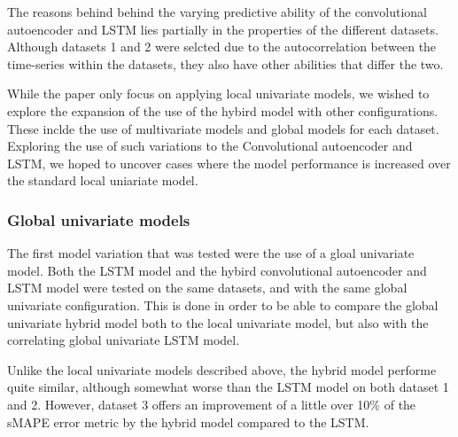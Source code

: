 The reasons behind behind the varying predictive ability of the convolutional autoencoder and LSTM lies partially
in the properties of the different datasets.
Although datasets 1 and 2 were selcted due to the autocorrelation between the time-series within the datasets,
they also have other abilities that differ the two.

  



While the paper \cite{Zhao2019} only focus on applying local univariate models,
we wished to explore the expansion of the use of the hybird model with other configurations.
These inclde the use of multivariate models and global models for each dataset.
Exploring the use of such variations to the Convolutional autoencoder and LSTM,
we hoped to uncover cases where the model performance is increased over the standard local uniariate model.



\subsubsection{Global univariate models}
The first model variation that was tested were the use of a gloal univariate model.
Both the LSTM model and the hybird convolutional autoencoder and LSTM model were tested on the same datasets,
and with the same global univariate configuration.
This is done in order to be able to compare the global univariate hybrid model both to the local univariate model,
but also with the correlating global univariate LSTM model.

Unlike the local univariate models described above, the hybrid model performe quite similar, although somewhat worse than the LSTM model
on both dataset 1 and 2.
However, dataset 3 offers an improvement of a little over 10\% of the sMAPE error metric by the hybrid model compared to the LSTM.


